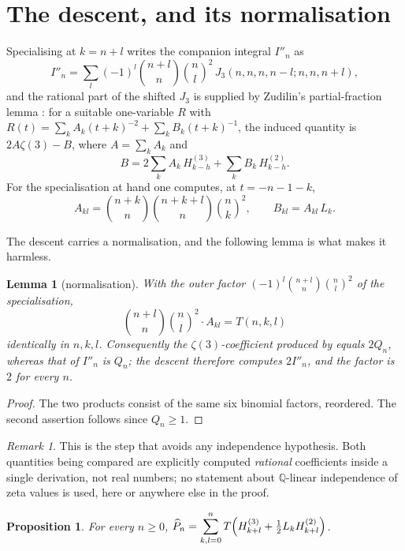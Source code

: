 \documentclass[11pt,a4paper]{amsart}
\theoremstyle{plain}
\newtheorem{lemma}[theorem]{Lemma}
\newtheorem{proposition}[theorem]{Proposition}
\theoremstyle{definition}
\theoremstyle{remark}
\newtheorem{remark}[theorem]{Remark}
\newcommand{\QQ}{\mathbb{Q}}
\newcommand{\T}{T}
\begin{document}
\section{The descent, and its normalisation}

Specialising \cite[(I3)]{BZ} at $k=n+l$ writes the companion integral $I''_n$ as
\[
  I''_n=\sum_{l}(-1)^l\binom{n+l}{n}\binom nl^2\,J_3(n,n,n,n-l;n,n,n+l),
\]
and the rational part of the shifted $J_3$ is supplied by Zudilin's partial-fraction
lemma \cite[Lemma 4]{Zu02}: for a suitable one-variable $R$ with
$R(t)=\sum_kA_k(t+k)^{-2}+\sum_kB_k(t+k)^{-1}$, the induced quantity is
$2A\zeta(3)-B$, where $A=\sum_kA_k$ and
\[
  B=2\sum_kA_k\,H^{(3)}_{k-h}+\sum_kB_k\,H^{(2)}_{k-h}.
\]
For the specialisation at hand one computes, at $t=-n-1-k$,
\begin{equation}\label{eq:AB}
  A_{kl}=\binom{n+k}{n}\binom{n+k+l}{n}\binom nk^2,
  \qquad B_{kl}=A_{kl}\,L_k .
\end{equation}

The descent carries a normalisation, and the following lemma is what makes it harmless.

\begin{lemma}[normalisation]\label{lem:norm}
With the outer factor $(-1)^l\binom{n+l}{n}\binom nl^2$ of the specialisation,
\[
  \binom{n+l}{n}\binom nl^2\cdot A_{kl}=\T(n,k,l)
\]
identically in $n,k,l$. Consequently the $\zeta(3)$-coefficient produced by
\cite[Lemma 4]{Zu02} equals $2Q_n$, whereas that of $I''_n$ is $Q_n$; the descent therefore
computes $2I''_n$, and the factor is $2$ for \emph{every} $n$.
\end{lemma}

\begin{proof}
The two products consist of the same six binomial factors, reordered. The second assertion
follows since $Q_n\ge1$.
\end{proof}

\begin{remark}
This is the step that avoids any independence hypothesis. Both quantities being compared are
explicitly computed \emph{rational} coefficients inside a single derivation, not real numbers;
no statement about $\QQ$-linear independence of zeta values is used, here or anywhere else in
the proof.
\end{remark}

\begin{proposition}\label{prop:descent}
For every $n\ge0$,
$\displaystyle \widehat P_n=\sum_{k,l=0}^{n}\T\Bigl(H^{(3)}_{k+l}+\tfrac12L_kH^{(2)}_{k+l}\Bigr)$.
\end{proposition}
\end{document}
